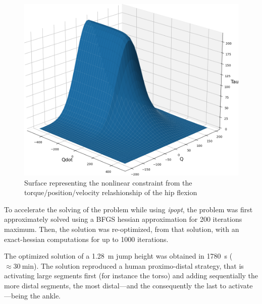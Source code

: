 \begin{figure}[h!]
\includegraphics[width=\columnwidth]{figures/torque_angle_velocity_hip_flexion}
\caption{Surface representing the nonlinear constraint from the torque/position/velocity relashionship of the hip flexion} 
\label{fig:graph_force_vitesse_longueur}
\end{figure}

To accelerate the solving of the problem while using \emph{ipopt}, the problem was first approximately solved using a BFGS hessian approximation for 200 iterations maximum.
Then, the solution was re-optimized, from that solution, with an exact-hessian computations for up to 1000 iterations.

The optimized solution of a \SI{1.28}{\meter} jump height was obtained in \SI{1780}{\second} ($\approx\SI{30}{\minute}$).
The solution reproduced a human proximo-distal strategy, that is activating large segments first (for instance the torso) and adding sequentially the more distal segments, the most distal---and the consequently the last to activate---being the ankle.
